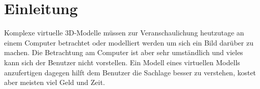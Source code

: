 \chapter{Einleitung}
\label{ch:Einleitung}


Komplexe virtuelle 3D-Modelle müssen zur Veranschaulichung heutzutage an einem Computer betrachtet oder modelliert werden um sich ein Bild darüber zu machen. Die Betrachtung am Computer ist aber sehr umständlich und vieles kann sich der Benutzer nicht vorstellen. Ein Modell eines virtuellen Modells anzufertigen dagegen hilft dem Benutzer die Sachlage besser zu verstehen, kostet aber meisten viel Geld und Zeit.